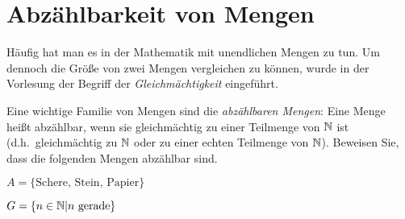 \documentclass[11pt]{scrartcl}
\begin{document}
\section{Abzählbarkeit von Mengen}
Häufig hat man es in der Mathematik mit unendlichen Mengen zu tun.
Um dennoch die Größe von zwei Mengen vergleichen zu können, wurde in der Vorlesung der Begriff der \emph{Gleichmächtigkeit} eingeführt.

Eine wichtige Familie von Mengen sind die \emph{abzählbaren Mengen}:
Eine Menge heißt abzählbar, wenn sie gleichmächtig zu einer Teilmenge von $\mathbb{N}$ ist (d.h.\ gleichmächtig zu $\mathbb{N}$ oder zu einer echten Teilmenge von $\mathbb{N}$).
Beweisen Sie, dass die folgenden Mengen abzählbar sind.
  \begin{subex}
    \item $A = \{ \mathrm{Schere},\, \mathrm{Stein},\, \mathrm{Papier} \}$
    \item $G = \{ n \in \mathbb{N} \vert n \mbox{ gerade} \}$
  \end{subex}
\end{document}
